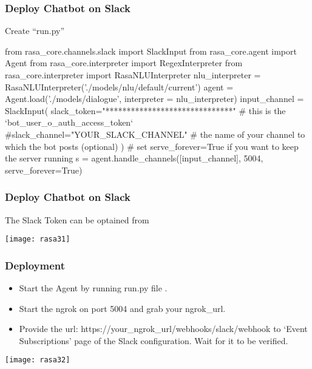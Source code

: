 \begin{frame}[fragile]\frametitle{Deploy Chatbot on Slack}
Create ``run.py''
\begin{listings}
from rasa_core.channels.slack import SlackInput
from rasa_core.agent import Agent
from rasa_core.interpreter import RegexInterpreter
from rasa_core.interpreter import RasaNLUInterpreter
nlu_interpreter = RasaNLUInterpreter('./models/nlu/default/current')
agent = Agent.load('./models/dialogue', interpreter = nlu_interpreter)
input_channel = SlackInput(
        slack_token="******************************"
        # this is the `bot_user_o_auth_access_token`
        #slack_channel="YOUR_SLACK_CHANNEL"
            # the name of your channel to which the bot posts (optional)
    )
# set serve_forever=True if you want to keep the server running
s = agent.handle_channels([input_channel], 5004, serve_forever=True)
\end{listings}

\end{frame}

\begin{frame}[fragile]\frametitle{Deploy Chatbot on Slack}
The Slack Token can be optained from


\begin{center}
\texttt{[image: rasa31]}
\end{center}
\end{frame}


\begin{frame}[fragile]\frametitle{Deployment}
\begin{itemize}
\item Start the Agent by running run.py file .
\item Start the ngrok on port 5004 and grab your ngrok\_url.
\item Provide the url: https://\<your\_ngrok\_url\>/webhooks/slack/webhook to ‘Event Subscriptions’ page of the Slack configuration. Wait for it to be verified.
\end{itemize}

\begin{center}
\texttt{[image: rasa32]}
\end{center}
\end{frame}


